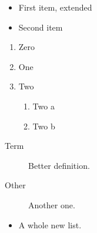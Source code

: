 \documentclass{article}
\begin{document}
\begin{itemize}
  \item First item, extended
  \item Second item
\end{itemize}
\begin{enumerate}
  \item Zero
  \item One
  \item Two
  \begin{enumerate}
    \item Two a
    \item Two b
  \end{enumerate}
\end{enumerate}
\begin{description}
  \item[Term] Better definition.
  \item[Other] Another one.
\end{description}
\begin{itemize}
  \item A whole new list.
\end{itemize}
\end{document}

